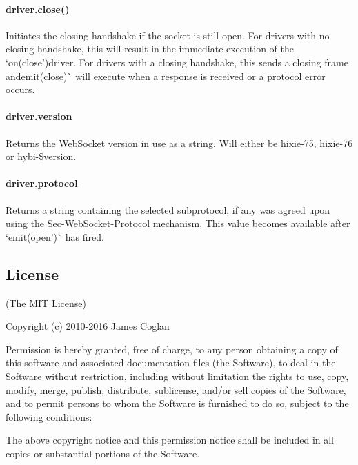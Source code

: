 \paragraph*{{\ttfamily driver.\+close()}}

Initiates the closing handshake if the socket is still open. For drivers with no closing handshake, this will result in the immediate execution of the `on(\textquotesingle{}close'){\ttfamily driver. For drivers with a closing handshake, this sends a closing frame and}emit(\textquotesingle{}close\textquotesingle{})\`{} will execute when a response is received or a protocol error occurs.

\paragraph*{{\ttfamily driver.\+version}}

Returns the Web\+Socket version in use as a string. Will either be {\ttfamily hixie-\/75}, {\ttfamily hixie-\/76} or {\ttfamily hybi-\/\$version}.

\paragraph*{{\ttfamily driver.\+protocol}}

Returns a string containing the selected subprotocol, if any was agreed upon using the {\ttfamily Sec-\/\+Web\+Socket-\/\+Protocol} mechanism. This value becomes available after `emit(\textquotesingle{}open')\`{} has fired.

\subsection*{License}

(The M\+IT License)

Copyright (c) 2010-\/2016 James Coglan

Permission is hereby granted, free of charge, to any person obtaining a copy of this software and associated documentation files (the \textquotesingle{}Software\textquotesingle{}), to deal in the Software without restriction, including without limitation the rights to use, copy, modify, merge, publish, distribute, sublicense, and/or sell copies of the Software, and to permit persons to whom the Software is furnished to do so, subject to the following conditions\+:

The above copyright notice and this permission notice shall be included in all copies or substantial portions of the Software.

